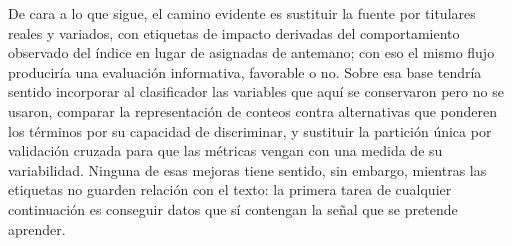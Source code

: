 \documentclass[11pt, a4paper]{article}
\begin{document}
De cara a lo que sigue, el camino evidente es sustituir la fuente por titulares reales y variados,
con etiquetas de impacto derivadas del comportamiento observado del índice en lugar de asignadas de
antemano; con eso el mismo flujo produciría una evaluación informativa, favorable o no. Sobre esa
base tendría sentido incorporar al clasificador las variables que aquí se conservaron pero no se
usaron, comparar la representación de conteos contra alternativas que ponderen los términos por su
capacidad de discriminar, y sustituir la partición única por validación cruzada para que las
métricas vengan con una medida de su variabilidad. Ninguna de esas mejoras tiene sentido, sin
embargo, mientras las etiquetas no guarden relación con el texto: la primera tarea de cualquier
continuación es conseguir datos que sí contengan la señal que se pretende aprender.
\end{document}
